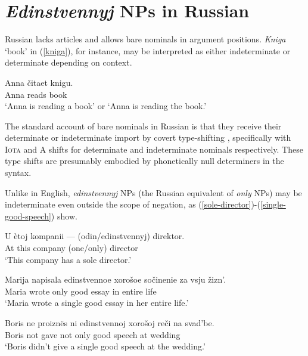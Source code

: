 \section{\textit{Edinstvennyj} NPs in Russian \label{sec:only-nps-russian}}
Russian lacks articles and allows bare nominals in argument positions. \textit{Kniga} `book' in (\ref{kniga}), for instance, may be interpreted as either indeterminate or determinate depending on context.

\begin{exe}
	\ex \label{kniga} \gll Anna \v{c}itaet knigu.\\
	Anna reads book\\
	\glt `Anna is reading a book' or `Anna is reading the book.'
\end{exe}

The standard account of bare nominals in Russian is that they receive their determinate or indeterminate import by covert type-shifting \citep{chierchia98}, specifically with  \textsc{Iota} and \textsc{A} shifts for determinate and indeterminate nominals respectively. These type shifts are presumably embodied by phonetically null determiners in the syntax.

Unlike in English, \textit{edinstvennyj} NPs (the Russian equivalent of \textit{only} NPs) may be indeterminate even outside the scope of negation, as (\ref{sole-director})-(\ref{single-good-speech}) show.

\begin{exe}
	\ex \label{sole-director} \gll U \`{e}toj kompanii --- (odin/edinstvennyj) direktor.\\
	At this company {} (one/only) director\\
	\glt `This company has a sole director.'
	
	\ex \label{single-good-essay} \gll Marija napisala edinstvennoe xoro\v{s}oe so\v{c}inenie za vsju \v{z}izn'.\\
	Maria wrote only good essay in entire life\\
	\glt `Maria wrote a single good essay in her entire life.'
	
	\ex \label{single-good-speech} \gll Boris ne proizn\"{e}s ni edinstvennoj xoro\v{s}oj re\v{c}i na svad'be.\\
	Boris not gave not only good speech at wedding\\
	\glt `Boris didn't give a single good speech at the wedding.'
\end{exe}

